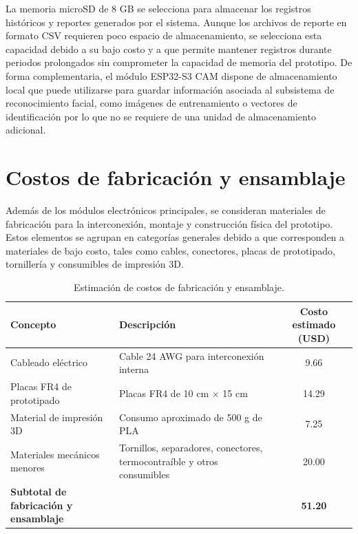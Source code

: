 La memoria microSD de 8 GB se selecciona para almacenar los registros históricos y
reportes generados por el sistema. Aunque los archivos de reporte en formato CSV requieren
poco espacio de almacenamiento, se selecciona esta capacidad debido a su bajo costo y a que
permite mantener registros durante periodos prolongados sin comprometer la capacidad de
memoria del prototipo. De forma complementaria, el módulo ESP32-S3 CAM dispone de
almacenamiento local que puede utilizarse para guardar información asociada al subsistema
de reconocimiento facial, como imágenes de entrenamiento o vectores de identificación por lo
que no se requiere de una unidad de almacenamiento adicional.

\section{Costos de fabricación y ensamblaje}

Además de los módulos electrónicos principales, se consideran materiales de fabricación
para la interconexión, montaje y construcción física del prototipo. Estos elementos se agrupan
en categorías generales debido a que corresponden a materiales de bajo costo, tales como
cables, conectores, placas de prototipado, tornillería y consumibles de impresión 3D.

\begin{table}[H]
\centering
\caption{Estimación de costos de fabricación y ensamblaje.}
\label{tab:presupuesto_fabricacion}

\begin{tabularx}{\textwidth}{X X c}
\toprule
\textbf{Concepto} &
\textbf{Descripción} &
\textbf{Costo estimado (USD)} \\
\midrule

Cableado eléctrico &
Cable 24 AWG para interconexión interna \cite{AWG24Wire} &
9.66 \\

Placas FR4 de prototipado &
Placas FR4 de 10 cm $\times$ 15 cm \cite{FR4ProtoBoard} &
14.29 \\

Material de impresión 3D &
Consumo aproximado de 500 g de PLA \cite{PLA500gCost} &
7.25 \\

Materiales mecánicos menores &
Tornillos, separadores, conectores, termocontraíble y otros consumibles &
20.00 \\

\midrule
\textbf{Subtotal de fabricación y ensamblaje} &
&
\textbf{51.20} \\

\bottomrule
\end{tabularx}
\end{table}

